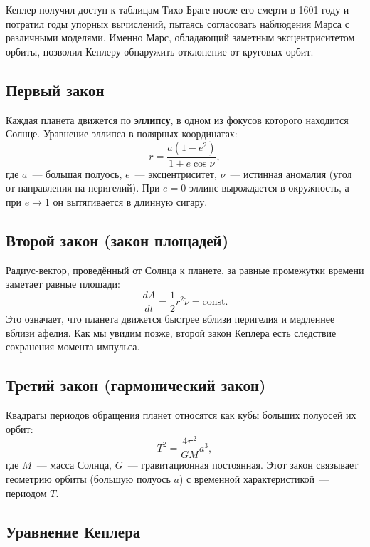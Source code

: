 \documentclass[12pt,a4paper]{article}
\begin{document}
Кеплер получил доступ к таблицам Тихо Браге после его смерти в 1601 году
и потратил годы упорных вычислений, пытаясь согласовать наблюдения Марса
с различными моделями. Именно Марс, обладающий заметным эксцентриситетом
орбиты, позволил Кеплеру обнаружить отклонение от круговых орбит.

\subsection*{Первый закон}
Каждая планета движется по \textbf{эллипсу}, в одном из фокусов которого
находится Солнце. Уравнение эллипса в полярных координатах:
\begin{equation}
  r = \frac{a(1 - e^2)}{1 + e \cos\nu},
\end{equation}
где $a$~--- большая полуось, $e$~--- эксцентриситет, $\nu$~--- истинная
аномалия (угол от направления на перигелий). При $e = 0$ эллипс вырождается
в окружность, а при $e \to 1$ он вытягивается в длинную сигару.

\subsection*{Второй закон (закон площадей)}
Радиус-вектор, проведённый от Солнца к планете, за равные промежутки времени
заметает равные площади:
\begin{equation}
  \frac{dA}{dt} = \frac{1}{2} r^2 \dot{\nu} = \text{const}.
\end{equation}
Это означает, что планета движется быстрее вблизи перигелия и медленнее
вблизи афелия. Как мы увидим позже, второй закон Кеплера есть следствие
сохранения момента импульса.

\subsection*{Третий закон (гармонический закон)}
Квадраты периодов обращения планет относятся как кубы больших полуосей их
орбит:
\begin{equation}
  T^2 = \frac{4\pi^2}{GM} a^3,
\end{equation}
где $M$~--- масса Солнца, $G$~--- гравитационная постоянная. Этот закон
связывает геометрию орбиты (большую полуось $a$) с временной
характеристикой~--- периодом $T$.

\subsection*{Уравнение Кеплера}
\end{document}
